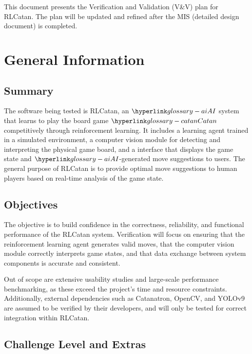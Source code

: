 \documentclass[12pt, titlepage]{article}
\begin{document}
\newpage


This document presents the Verification and Validation (V\&V) plan for RLCatan. The plan will be updated and refined after the MIS (detailed design document) is completed.


\section{General Information}

\subsection{Summary}


  The software being tested is RLCatan,
 an $\AI{}$  system that learns to play the board game $\Catan{}$
 competitively through reinforcement learning. 
 It includes a learning agent trained in a simulated
  environment, a computer vision module for detecting 
  and interpreting the physical game board, and a
  interface that displays the game state and $\AI{}$-generated
  move suggestions to users. The general purpose of RLCatan
  is to provide optimal move suggestions to human players
  based on real-time analysis of the game state.

\subsection{Objectives}


The objective is to build confidence 
in the correctness, reliability, and functional performance of the RLCatan system.
 Verification will focus on ensuring that the reinforcement learning agent generates 
 valid moves, that the computer vision module correctly interprets game states, and 
 that data exchange between system components is accurate and consistent.

\medskip

 Out of scope are extensive usability studies and large-scale performance benchmarking,
 as these exceed the project’s time and resource constraints. Additionally, external
  dependencies such as Catanatron, OpenCV, and YOLOv9 are assumed to be verified by
   their developers, and will only be tested for correct integration within RLCatan.

\subsection{Challenge Level and Extras}
\end{document}
